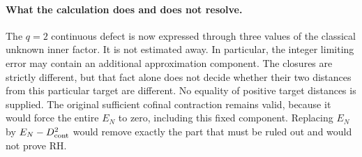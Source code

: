 \paragraph{What the calculation does and does not resolve.}
The $q=2$ continuous defect is now expressed through three values of the
classical unknown inner factor. It is not estimated away. In particular,
the integer limiting error may contain an additional approximation
component. The closures are strictly different, but that fact alone
does not decide whether their two distances from this particular target
are different. No equality of positive target distances is supplied.
The original sufficient cofinal contraction remains valid, because it
would force the entire $E_N$ to zero, including this fixed component.
Replacing $E_N$ by $E_N-D_{\rm cont}^2$ would remove exactly the part
that must be ruled out and would not prove RH.
